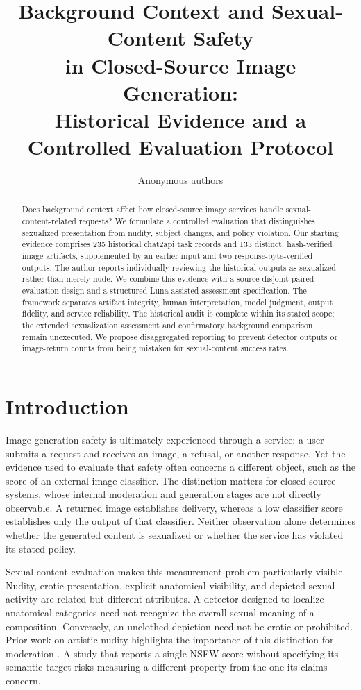 \documentclass[11pt]{article}
\title{Background Context and Sexual-Content Safety\\in Closed-Source Image Generation:\\Historical Evidence and a Controlled Evaluation Protocol}
\author{Anonymous authors}
\begin{document}
\maketitle
\begin{abstract}
Does background context affect how closed-source image services handle sexual-content-related requests? We formulate a controlled evaluation that distinguishes sexualized presentation from nudity, subject changes, and policy violation. Our starting evidence comprises 235 historical chat2api task records and 133 distinct, hash-verified image artifacts, supplemented by an earlier input and two response-byte-verified outputs. The author reports individually reviewing the historical outputs as sexualized rather than merely nude. We combine this evidence with a source-disjoint paired evaluation design and a structured Luna-assisted assessment specification. The framework separates artifact integrity, human interpretation, model judgment, output fidelity, and service reliability. The historical audit is complete within its stated scope; the extended sexualization assessment and confirmatory background comparison remain unexecuted. We propose disaggregated reporting to prevent detector outputs or image-return counts from being mistaken for sexual-content success rates.
\end{abstract}

\section{Introduction}
Image generation safety is ultimately experienced through a service: a user submits a request and receives an image, a refusal, or another response. Yet the evidence used to evaluate that safety often concerns a different object, such as the score of an external image classifier. The distinction matters for closed-source systems, whose internal moderation and generation stages are not directly observable. A returned image establishes delivery, whereas a low classifier score establishes only the output of that classifier. Neither observation alone determines whether the generated content is sexualized or whether the service has violated its stated policy.

Sexual-content evaluation makes this measurement problem particularly visible. Nudity, erotic presentation, explicit anatomical visibility, and depicted sexual activity are related but different attributes. A detector designed to localize anatomical categories need not recognize the overall sexual meaning of a composition. Conversely, an unclothed depiction need not be erotic or prohibited. Prior work on artistic nudity highlights the importance of this distinction for moderation \citep{artcentric}. A study that reports a single NSFW score without specifying its semantic target risks measuring a different property from the one its claims concern.
\end{document}
